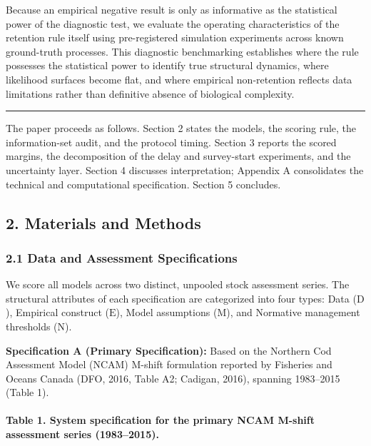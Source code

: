 \documentclass[11pt]{article}
\begin{document}
Because an empirical negative result is only as informative as the
statistical power of the diagnostic test, we evaluate the operating
characteristics of the retention rule itself using pre-registered
simulation experiments across known ground-truth processes. This
diagnostic benchmarking establishes where the rule possesses the
statistical power to identify true structural dynamics, where likelihood
surfaces become flat, and where empirical non-retention reflects data
limitations rather than definitive absence of biological complexity.

\begin{center}\rule{0.5\linewidth}{0.5pt}\end{center}

The paper proceeds as follows. Section 2 states the models, the scoring
rule, the information-set audit, and the protocol timing. Section 3
reports the scored margins, the decomposition of the delay and
survey-start experiments, and the uncertainty layer. Section 4 discusses
interpretation; Appendix A consolidates the technical and computational
specification. Section 5 concludes.

\subsection{2. Materials and Methods}\label{materials-and-methods}

\subsubsection{2.1 Data and Assessment
Specifications}\label{data-and-assessment-specifications}

We score all models across two distinct, unpooled stock assessment
series. The structural attributes of each specification are categorized
into four types: Data (\(\mathrm{D}\)), Empirical construct
(\(\mathrm{E}\)), Model assumptions (\(\mathrm{M}\)), and Normative
management thresholds (\(\mathrm{N}\)).

\textbf{Specification A (Primary Specification):} Based on the Northern
Cod Assessment Model (NCAM) M-shift formulation reported by Fisheries
and Oceans Canada (DFO, 2016, Table A2; Cadigan, 2016), spanning
1983--2015 (Table 1).

\paragraph{Table 1. System specification for the primary NCAM M-shift
assessment series
(1983--2015).}\label{table-1.-system-specification-for-the-primary-ncam-m-shift-assessment-series-19832015.}
\end{document}
